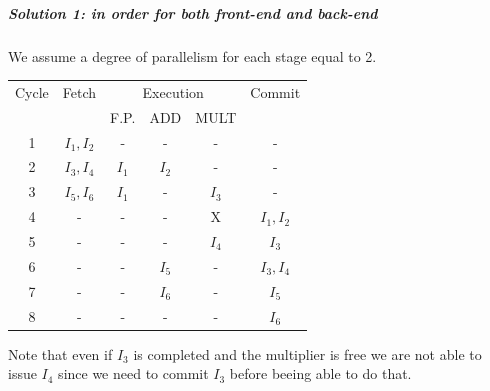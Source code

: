 \subparagraph{Solution 1: in order for both front-end and back-end}
We assume a degree of parallelism for each stage equal to 2.

\begin{center}
  \begin{tabular}{|c|c|c|c|c|c|}
    \hline
    Cycle    &Fetch     &\multicolumn{3}{|c|}{Execution}  &   Commit  \\
     &       &     F.P.  & ADD & MULT  &               \\ \hline \hline
    1&       $I_1, I_2$  &     -&    -&    -&        -\\
    2&       $I_3, I_4$  &       $I_1$&  $I_2$&  -&        -\\
    3&       $I_5, I_6$  &       $I_1$&  -&    $I_3$ &      -\\
    4&      -&          -&    -&     X &      $I_1,I_2$ \\
    5&      -&          -&    -&    $I_4$&      $I_3$ \\
    6&      -&          -&    $I_5$&    -&      $I_3,I_4$\\
    7&      -&          -&    $I_6$&    -&      $I_5$\\
    8&      -&          -&    -&      -&      $I_6$\\
    \hline
  \end{tabular}
\end{center}
Note that even if $I_3$ is completed and the multiplier is free  we are not
able to issue $I_4$ since we need to commit $I_3$ before beeing able to do
that.

